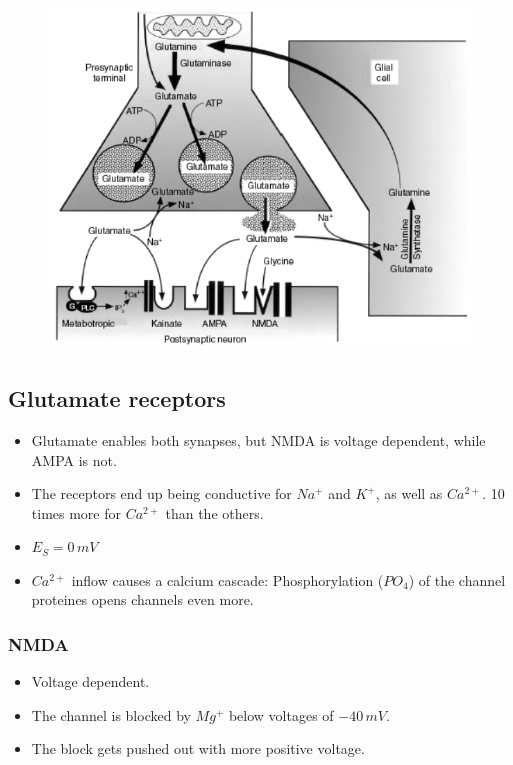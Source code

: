 \documentclass[a4paper, 12pt]{article}
\begin{document}
\begin{figure}[H]
	\centering
 	\includegraphics[scale=0.5]{glutamate-neuron.png}
\end{figure} 

\subsection{Glutamate receptors}
\begin{itemize}[noitemsep,nolistsep]
	\item Glutamate enables both synapses, but NMDA is voltage dependent, while AMPA is not.
	\item The receptors end up being conductive for $Na^+$ and $K^+$, as well as $Ca^{2+}$. 10 times more for $Ca^{2+}$ than the others.
	\item $E_S = 0\,mV$
	\item $Ca^{2+}$ inflow causes a calcium cascade: Phosphorylation ($PO_4$) of the channel proteines opens channels even more.
\end{itemize}

\subsubsection{NMDA}
\begin{itemize}[noitemsep,nolistsep]
	\item Voltage dependent.
	\item The channel is blocked by $Mg^+$ below voltages of $-40\,mV$.
	\item The block gets pushed out with more positive voltage.
\end{itemize}
\end{document}
